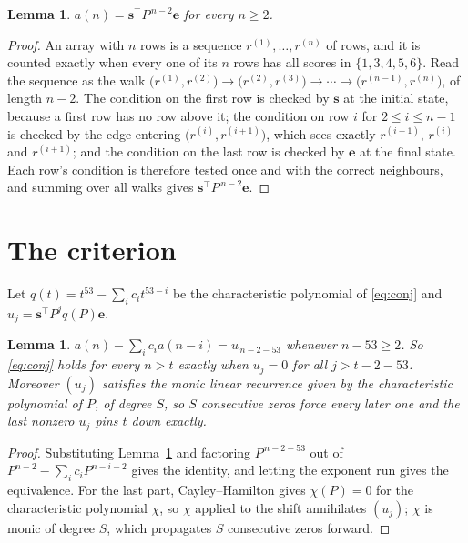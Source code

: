 \documentclass[11pt,a4paper]{article}
\theoremstyle{plain}
\newtheorem{lemma}[theorem]{Lemma}
\theoremstyle{definition}
\begin{document}
\begin{lemma}\label{lem:walk}
$a(n)=\mathbf{s}^{\!\top}P^{\,n-2}\mathbf{e}$ for every $n\ge2$.
\end{lemma}

\begin{proof}
An array with $n$ rows is a sequence $r^{(1)},\dots,r^{(n)}$ of rows, and it is counted
exactly when every one of its $n$ rows has all scores in $\{1,3,4,5,6\}$. Read the sequence as the
walk $\bigl(r^{(1)},r^{(2)}\bigr)\to\bigl(r^{(2)},r^{(3)}\bigr)\to\cdots\to
\bigl(r^{(n-1)},r^{(n)}\bigr)$, of length $n-2$. The condition on the first row is
checked by $\mathbf{s}$ at the initial state, because a first row has no row above it; the
condition on row $i$ for $2\le i\le n-1$ is checked by the edge entering
$\bigl(r^{(i)},r^{(i+1)}\bigr)$, which sees exactly $r^{(i-1)}$, $r^{(i)}$ and
$r^{(i+1)}$; and the condition on the last row is checked by $\mathbf{e}$ at the final
state. Each row's condition is therefore tested once and with the correct neighbours, and
summing over all walks gives $\mathbf{s}^{\!\top}P^{\,n-2}\mathbf{e}$.
\end{proof}

\section{The criterion}

Let $q(t)=t^{53}-\sum_i c_i t^{53-i}$ be the characteristic polynomial of
\eqref{eq:conj} and $u_j=\mathbf{s}^{\!\top}P^{j}q(P)\mathbf{e}$.

\begin{lemma}\label{lem:crit}
$a(n)-\sum_i c_i a(n-i)=u_{\,n-2-53}$ whenever $n-53\ge2$. So \eqref{eq:conj}
holds for every $n>t$ exactly when $u_j=0$ for all $j>t-2-53$. Moreover $(u_j)$
satisfies the monic linear recurrence given by the characteristic polynomial of $P$, of
degree $S$, so $S$ consecutive zeros force every later one and the last nonzero $u_j$ pins
$t$ down exactly.
\end{lemma}

\begin{proof}
Substituting Lemma~\ref{lem:walk} and factoring $P^{\,n-2-53}$ out of
$P^{n-2}-\sum_i c_i P^{n-i-2}$ gives the identity, and letting the exponent run gives the
equivalence. For the last part, Cayley--Hamilton gives $\chi(P)=0$ for the characteristic
polynomial $\chi$, so $\chi$ applied to the shift annihilates $(u_j)$; $\chi$ is monic of
degree $S$, which propagates $S$ consecutive zeros forward.
\end{proof}
\end{document}
